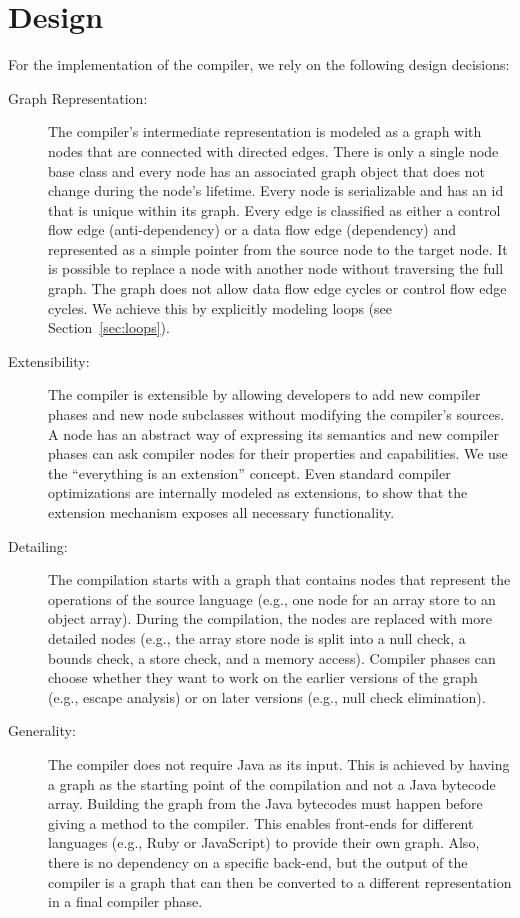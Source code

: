 \documentclass[twocolumn]{svjour3}
\begin{document}
\section{Design}
For the implementation of the compiler, we rely on the following design decisions:
\begin{description}
\item[Graph Representation:]
The compiler's intermediate representation is modeled as a graph with nodes that are connected with directed edges.
There is only a single node base class and every node has an associated graph object that does not change during the node's lifetime.
Every node is serializable and has an id that is unique within its graph.
Every edge is classified as either a control flow edge (anti-dependency) or a data flow edge (dependency) and represented as a simple pointer from the source node to the target node.
It is possible to replace a node with another node without traversing the full graph.
The graph does not allow data flow edge cycles or control flow edge cycles.
We achieve this by explicitly modeling loops (see Section~\ref{sec:loops}). 
\item[Extensibility:]
The compiler is extensible by allowing developers to add new compiler phases and new node subclasses without modifying the compiler's sources.
A node has an abstract way of expressing its semantics and new compiler phases can ask compiler nodes for their properties and capabilities.
We use the ``everything is an extension'' concept.
Even standard compiler optimizations are internally modeled as extensions, to show that the extension mechanism exposes all necessary functionality.
\item[Detailing:]
The compilation starts with a graph that contains nodes that represent the operations of the source language (e.g., one node for an array store to an object array).
During the compilation, the nodes are replaced with more detailed nodes (e.g., the array store node is split into a null check, a bounds check, a store check, and a memory access).
Compiler phases can choose whether they want to work on the earlier versions of the graph (e.g., escape analysis) or on later versions (e.g., null check elimination).
\item[Generality:]
The compiler does not require Java as its input.
This is achieved by having a graph as the starting point of the compilation and not a Java bytecode array.
Building the graph from the Java bytecodes must happen before giving a method to the compiler.
This enables front-ends for different languages (e.g., Ruby or JavaScript) to provide their own graph.
Also, there is no dependency on a specific back-end, but the output of the compiler is a graph that can then be converted to a different representation in a final compiler phase.
\end{description}
\end{document}
